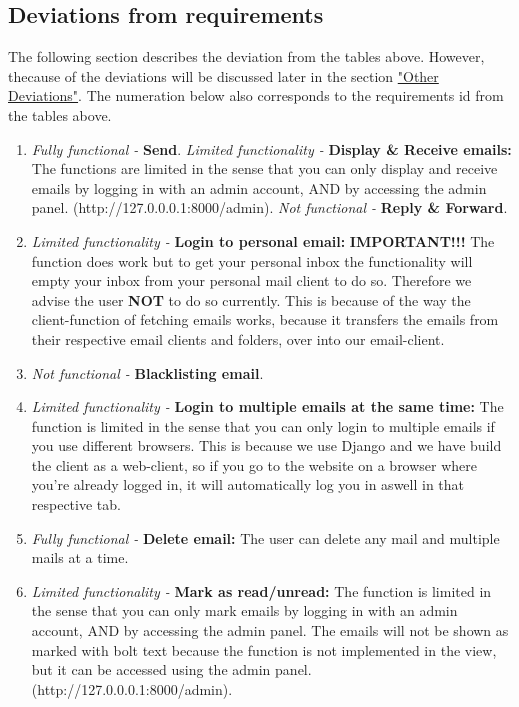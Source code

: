 \documentclass{article}
\begin{document}
\subsection*{Deviations from requirements}
The following section describes the deviation from the tables above. However, thecause of the deviations will be discussed later in the section \hyperref[sec:deviations]{"Other Deviations"}. The numeration below also corresponds to the requirements id from the tables above.
\begin{enumerate}
    \item \textit{Fully functional - }\textbf{Send}. 
    \newline \textit{Limited functionality - }\textbf{Display \& Receive emails: } The functions are limited in the sense that you can only display and receive emails by logging in with an admin account, AND by accessing the admin panel. (http://127.0.0.0.1:8000/admin).
    \newline \textit{Not functional - }\textbf{Reply \& Forward}.
    
    \item  \textit{Limited functionality - }\textbf{Login to personal email: }\textbf{IMPORTANT!!!} The function does work but to get your personal inbox the functionality will empty your inbox from your personal mail client to do so. Therefore we advise the user \textbf{NOT} to do so currently. This is because of the way the client-function of fetching emails works, because it transfers the emails from their respective email clients and folders, over into our email-client.
    
    \item \textit{Not functional - }\textbf{Blacklisting email}.
    
    \item \textit{Limited functionality - }\textbf{Login to multiple emails at the same time: } The function is limited in the sense that you can only login to multiple emails if you use different browsers. This is because we use Django and we have build the client as a web-client, so if you go to the website on a browser where you're already logged in, it will automatically log you in aswell in that respective tab.
    
    
    \item \textit{Fully functional - }\textbf{Delete email: } The user can delete any mail and multiple mails at a time.
    
    
    \item \textit{Limited functionality - }\textbf{Mark as read/unread:} The function is limited in the sense that you can only mark emails by logging in with an admin account, AND by accessing the admin panel. The emails will not be shown as marked with bolt text because the function is not implemented in the view, but it can be accessed using the admin panel. (http://127.0.0.0.1:8000/admin).
    

\end{enumerate}
\end{document}
